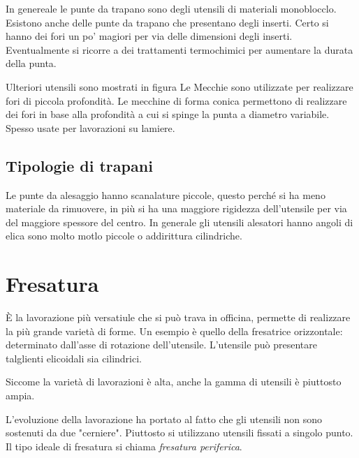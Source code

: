 In genereale le punte da trapano sono degli utensili di materiali monoblocclo. Esistono anche delle punte
da trapano che presentano degli inserti. Certo si hanno dei fori un po' magiori per via delle dimensioni
degli inserti.
Eventualmente si ricorre a dei trattamenti termochimici per aumentare la durata della punta.

Ulteriori utensili sono mostrati in figura
Le Mecchie sono utilizzate per realizzare fori di piccola profondità.
Le mecchine di forma conica permettono di realizzare dei fori in base alla profondità a cui si spinge la punta
a diametro variabile. Spesso usate per lavorazioni su lamiere.


\subsection{Tipologie di trapani}

Le punte da alesaggio hanno scanalature piccole, questo perché si ha meno materiale da rimuovere, in più 
si ha una maggiore rigidezza dell'utensile per via del maggiore spessore del centro.
In generale gli utensili alesatori hanno angoli di elica sono molto motlo piccole o addirittura cilindriche.

\section{Fresatura}
È la lavorazione più versatiule che si può trava in officina, permette di realizzare la più grande varietà 
di forme.
Un esempio è quello della fresatrice orizzontale: determinato dall'asse di rotazione dell'utensile.
L'utensile può presentare talglienti elicoidali sia cilindrici.

Siccome la varietà di lavorazioni è alta, anche la gamma di utensili è piuttosto ampia.

L'evoluzione della lavorazione ha portato al fatto che gli utensili non sono sostenuti da due "cerniere".
Piuttosto si utilizzano utensili fissati a singolo punto.
Il tipo ideale di fresatura si chiama \emph{fresatura periferica}.

